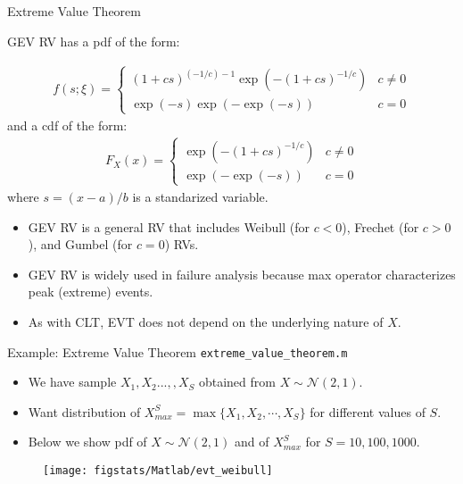 \documentclass[9pt]{beamer}
\begin{document}
%
\begin{frame}{Extreme Value Theorem}

GEV RV has a pdf of the form:
\begin{block}{}
\begin{align*}
f(s;\xi) = \begin{cases}(1+c s)^{(-1/c)-1} \exp(-(1+c s)^{-1/c}) & c\neq0 \\
\exp(-s) \exp(-\exp(-s)) & c = 0\end{cases}
\end{align*}
and a cdf of the form:
\begin{align*}
F_X(x)= \begin{cases}\exp(-(1+c s)^{-1/c}) & c\neq0 \\ \exp(-\exp(-s)) & c = 0\end{cases}
\end{align*}
where $s=(x-a)/b$ is a standarized variable. 
\end{block}
\begin{itemize}
\setlength{\itemsep}{10pt}
\item GEV RV is a general RV that includes Weibull (for $c<0$), Frechet (for $c>0$), and Gumbel (for $c=0$) RVs. 

\item GEV RV is widely used in failure analysis because max operator characterizes peak (extreme) events. 

\item As with CLT,  EVT does not depend on the underlying nature of $X$. 

\end{itemize}


\end{frame}

%
\begin{frame}{Example: Extreme Value Theorem \footnotesize{\texttt{extreme\_value\_theorem.m}}}

\begin{itemize}
\setlength{\itemsep}{5pt}
\item We have sample $X_1,X_2...,,X_S$ obtained from $X\sim \mathcal{N}(2,1)$.
\item Want distribution of $X_{max}^S=\max\{X_1,X_2,\cdots, X_S\}$ for different values of $S$.
\item Below we show pdf of $X\sim \mathcal{N}(2,1)$ and of $X_{max}^S$ for $S=10,100,1000$.
\end{itemize}
\begin{figure}[!htb]
    \centering
	\texttt{[image: figstats/Matlab/evt\_weibull]}
\end{figure}

\end{frame}
\end{document}
